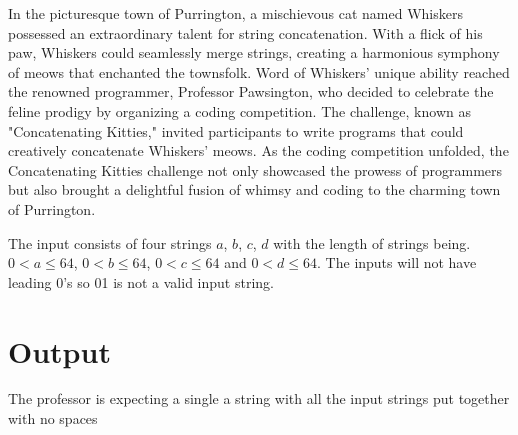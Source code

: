 In the picturesque town of Purrington, a mischievous cat named Whiskers possessed an extraordinary talent for string concatenation. With a flick of his paw, Whiskers could seamlessly merge strings, creating a harmonious symphony of meows that enchanted the townsfolk.
{\setlength{\parindent}{0cm}
Word of Whiskers' unique ability reached the renowned programmer, Professor Pawsington, who decided to celebrate the feline prodigy by organizing a coding competition. The challenge, known as "Concatenating Kitties," invited participants to write programs that could creatively concatenate Whiskers' meows. As the coding competition unfolded, the Concatenating Kitties challenge not only showcased the prowess of programmers but also brought a delightful fusion of whimsy and coding to the charming town of Purrington.
}
\begin{Input}
The input consists of four strings $a$, $b$, $c$, $d$ with the length of strings being.
{\setlength{\parindent}{0cm}
$0 < a\leq 64$,
$0 < b\leq 64$, 
$0 < c\leq 64$ and
$0 < d\leq 64$.
}
{\setlength{\parindent}{0cm}
The inputs will not have leading 0's so 01 is not a valid input string.
}
\end{Input}

\section*{Output}
The professor is expecting a single a string with all the input strings put together with no spaces
